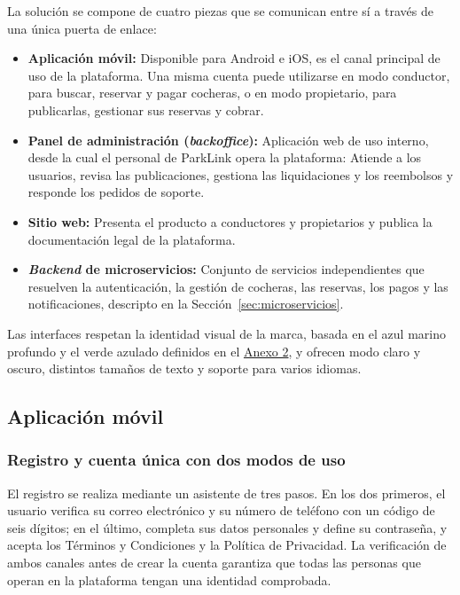 La solución se compone de cuatro piezas que se comunican entre sí a través de una única puerta de enlace:

\begin{itemize}
    \item \textbf{Aplicación móvil:} Disponible para Android e iOS, es el canal principal de uso de la plataforma. Una misma cuenta puede utilizarse en modo conductor, para buscar, reservar y pagar cocheras, o en modo propietario, para publicarlas, gestionar sus reservas y cobrar.
    \item \textbf{Panel de administración (\textit{backoffice}):} Aplicación web de uso interno, desde la cual el personal de ParkLink opera la plataforma: Atiende a los usuarios, revisa las publicaciones, gestiona las liquidaciones y los reembolsos y responde los pedidos de soporte.
    \item \textbf{Sitio web:} Presenta el producto a conductores y propietarios y publica la documentación legal de la plataforma.
    \item \textbf{\textit{Backend} de microservicios:} Conjunto de servicios independientes que resuelven la autenticación, la gestión de cocheras, las reservas, los pagos y las notificaciones, descripto en la Sección~\ref{sec:microservicios}.
\end{itemize}

Las interfaces respetan la identidad visual de la marca, basada en el azul marino profundo y el verde azulado definidos en el \hyperref[anexo:colorimetria]{Anexo 2}, y ofrecen modo claro y oscuro, distintos tamaños de texto y soporte para varios idiomas.

\subsection{Aplicación móvil}

\subsubsection{Registro y cuenta única con dos modos de uso}

El registro se realiza mediante un asistente de tres pasos. En los dos primeros, el usuario verifica su correo electrónico y su número de teléfono con un código de seis dígitos; en el último, completa sus datos personales y define su contraseña, y acepta los Términos y Condiciones y la Política de Privacidad. La verificación de ambos canales antes de crear la cuenta garantiza que todas las personas que operan en la plataforma tengan una identidad comprobada.

